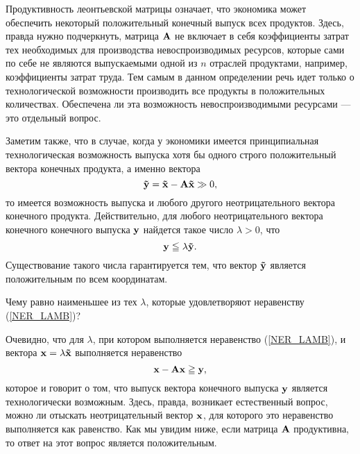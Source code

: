     Продуктивность леонтьевской матрицы означает, что
    экономика может обеспечить некоторый положительный конечный выпуск всех
    продуктов. Здесь, правда нужно подчеркнуть, матрица $\mathbf{A}$
    не включает в себя коэффициенты затрат тех необходимых для
    производства невоспроизводимых
    ресурсов, которые сами по себе не являются выпускаемыми одной из
    $n$ отраслей продуктами, например, коэффициенты затрат труда. Тем
    самым в данном определении речь идет только о технологической
    возможности производить все продукты в положительных
    количествах. Обеспечена ли эта возможность невоспроизводимыми
    ресурсами --- это отдельный вопрос.

    Заметим также, что в случае, когда у экономики имеется принципиальная
    технологическая возможность выпуска хотя бы одного строго
    положительный вектора конечных продукта, а именно вектора
    \[\mathbf{\tilde{y}}=\mathbf{\tilde{x}}-\mathbf{A}\mathbf{\tilde{x}}\gg0,\]
     то имеется
    возможность выпуска и любого другого неотрицательного вектора
    конечного продукта. Действительно, для любого неотрицательного
    вектора конечного конечного выпуска $\mathbf{y}$ найдется такое
    число $\lambda>0$, что
\begin{equation}
    \label{NER_LAMB}
    \mathbf{y}\leqq\lambda\mathbf{\tilde{y}}.
\end{equation}
    Существование такого числа гарантируется тем, что вектор
    $\mathbf{\tilde{y}}$ является положительным по всем координатам.
\begin{exer}
    Чему равно наименьшее из тех $\lambda$, которые удовлетворяют неравенству
    (\ref{NER_LAMB})?
\end{exer}
    Очевидно, что для $\lambda$, при котором выполняется
    неравенство (\ref{NER_LAMB}), и вектора
    $\mathbf{x}=\lambda\mathbf{\tilde{x}}$ выполняется неравенство
    \[\mathbf{x}-\mathbf{A}\mathbf{x}\geqq\mathbf{y},\]
    которое и говорит о том, что выпуск вектора конечного выпуска
    $\mathbf{y}$ является технологически возможным. Здесь, правда,
    возникает естественный вопрос, можно ли отыскать неотрицательный
    вектор $\mathbf{x}$, для которого это неравенство выполняется как
    равенство. Как мы увидим ниже, если матрица $\mathbf{A}$
    продуктивна, то ответ на этот вопрос является положительным.


